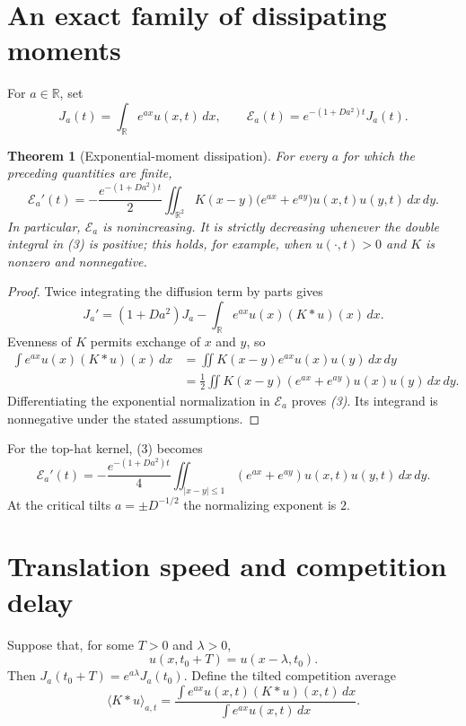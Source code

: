 \documentclass[11pt]{article}
\newtheorem{theorem}{Theorem}
\newcommand{\R}{\mathbb R}
\begin{document}
\section{An exact family of dissipating moments}

For $a\in\R$, set
\[
 J_a(t)=\int_{\R}e^{ax}u(x,t)\,dx,
 \qquad
 \mathcal E_a(t)=e^{-(1+Da^2)t}J_a(t).
\]

\begin{theorem}[Exponential-moment dissipation]\label{thm:dissipation}
For every $a$ for which the preceding quantities are finite,
\begin{equation}
 \mathcal E_a'(t)
 =-\frac{e^{-(1+Da^2)t}}2
 \iint_{\R^2}K(x-y)\bigl(e^{ax}+e^{ay}\bigr)
 u(x,t)u(y,t)\,dx\,dy.
\end{equation}
In particular, $\mathcal E_a$ is nonincreasing.  It is strictly decreasing
whenever the double integral in \emph{(3)} is positive; this holds, for
example, when $u(\cdot,t)>0$ and $K$ is nonzero and nonnegative.
\end{theorem}

\begin{proof}
Twice integrating the diffusion term by parts gives
\begin{equation}
 J_a'=(1+Da^2)J_a-
 \int_{\R}e^{ax}u(x)(K*u)(x)\,dx.
\end{equation}
Evenness of $K$ permits exchange of $x$ and $y$, so
\begin{align*}
 \int e^{ax}u(x)(K*u)(x)\,dx
 &=\iint K(x-y)e^{ax}u(x)u(y)\,dx\,dy\\
 &=\frac12\iint K(x-y)(e^{ax}+e^{ay})u(x)u(y)\,dx\,dy.
\end{align*}
Differentiating the exponential normalization in $\mathcal E_a$ proves
\emph{(3)}.  Its integrand is nonnegative under the stated assumptions.
\end{proof}

For the top-hat kernel, (3) becomes
\begin{equation}
 \mathcal E_a'(t)
 =-\frac{e^{-(1+Da^2)t}}4
 \iint_{|x-y|\leq1}(e^{ax}+e^{ay})u(x,t)u(y,t)\,dx\,dy.
\end{equation}
At the critical tilts $a=\pm D^{-1/2}$ the normalizing exponent is $2$.

\section{Translation speed and competition delay}

Suppose that, for some $T>0$ and $\lambda>0$,
\begin{equation}
 u(x,t_0+T)=u(x-\lambda,t_0).
\end{equation}
Then $J_a(t_0+T)=e^{a\lambda}J_a(t_0)$.  Define the tilted
competition average
\begin{equation}
 \langle K*u\rangle_{a,t}
 =\frac{\int e^{ax}u(x,t)(K*u)(x,t)\,dx}
        {\int e^{ax}u(x,t)\,dx}.
\end{equation}
\end{document}
